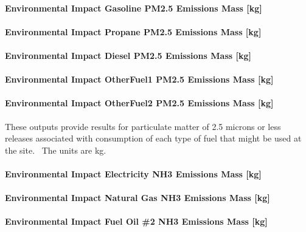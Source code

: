 \paragraph{Environmental Impact Gasoline PM2.5 Emissions Mass {[}kg{]}}\label{environmental-impact-gasoline-pm2.5-emissions-mass-kg}

\paragraph{Environmental Impact Propane PM2.5 Emissions Mass {[}kg{]}}\label{environmental-impact-propane-pm2.5-emissions-mass-kg}

\paragraph{Environmental Impact Diesel PM2.5 Emissions Mass {[}kg{]}}\label{environmental-impact-diesel-pm2.5-emissions-mass-kg}

\paragraph{Environmental Impact OtherFuel1 PM2.5 Emissions Mass {[}kg{]}}\label{environmental-impact-otherfuel1-pm2.5-emissions-mass-kg}

\paragraph{Environmental Impact OtherFuel2 PM2.5 Emissions Mass {[}kg{]}}\label{environmental-impact-otherfuel2-pm2.5-emissions-mass-kg}

These outputs provide results for particulate matter of 2.5 microns or less releases associated with consumption of each type of fuel that might be used at the site.~ The units are kg.

\paragraph{Environmental Impact Electricity NH3 Emissions Mass {[}kg{]}}\label{environmental-impact-electricity-nh3-emissions-mass-kg}

\paragraph{Environmental Impact Natural Gas NH3 Emissions Mass {[}kg{]}}\label{environmental-impact-natural-gas-nh3-emissions-mass-kg}

\paragraph{Environmental Impact Fuel Oil \#2 NH3 Emissions Mass {[}kg{]}}\label{environmental-impact-fuel-oil-2-nh3-emissions-mass-kg}

